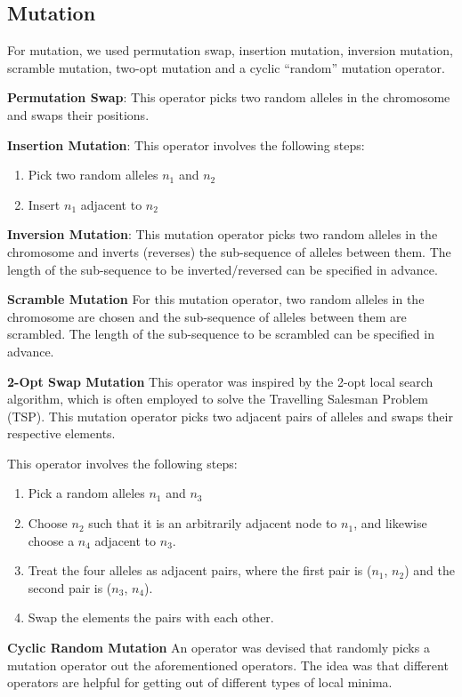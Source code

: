 \documentclass[12pt,twocolumn,oneside]{osajnl}
\begin{document}
\subsection{Mutation}
For mutation, we used permutation swap, insertion mutation, inversion mutation, scramble mutation, two-opt mutation and a cyclic “random” mutation operator.

\textbf{Permutation Swap}: This operator picks two random alleles in the chromosome and swaps their positions.

\textbf{Insertion Mutation}: This operator involves the following steps:
\begin{enumerate}
    \item Pick two random alleles $n_1$ and $n_2$
    \item Insert $n_1$ adjacent to $n_2$
\end{enumerate}

\textbf{Inversion Mutation}: This mutation operator picks two random alleles in the chromosome and inverts (reverses) the sub-sequence of alleles between them. The length of the sub-sequence to be inverted/reversed can be specified in advance.

\textbf{Scramble Mutation}
For this mutation operator, two random alleles in the chromosome are chosen and the sub-sequence of alleles between them are scrambled. The length of the sub-sequence to be scrambled can be specified in advance.

\textbf{2-Opt Swap Mutation}
This operator was inspired by the 2-opt local search algorithm, which is often employed to solve the Travelling Salesman Problem (TSP).  This mutation operator picks two adjacent pairs of alleles and swaps their respective elements\cite{croes1958method}.

This operator involves the following steps:

\begin{enumerate}
    \item Pick a random alleles $n_1$ and $n_3$
    \item Choose $n_2$ such that it is an arbitrarily adjacent node to $n_1$, and likewise choose a $n_4$ adjacent to $n_3$.
    \item Treat the four alleles as adjacent pairs, where the first pair is ($n_1$, $n_2$) and the second pair is ($n_3$, $n_4$).
    \item Swap the elements the pairs with each other.
\end{enumerate}


\textbf{Cyclic Random Mutation}
An operator was devised that randomly picks a mutation operator out the aforementioned operators. The idea was that different operators are helpful for getting out of different types of local minima.
\end{document}
